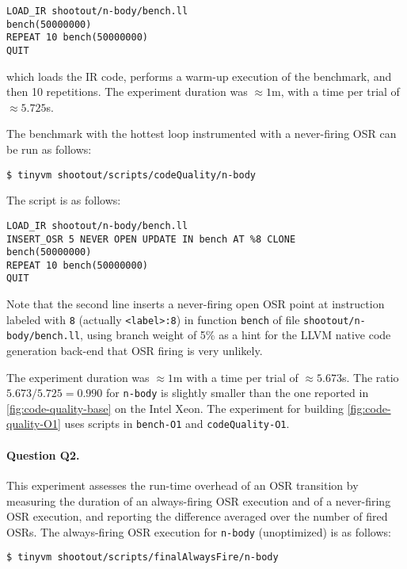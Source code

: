 \begin{small}
\begin{verbatim}
LOAD_IR shootout/n-body/bench.ll
bench(50000000)
REPEAT 10 bench(50000000)
QUIT
\end{verbatim}
\end{small}

\noindent which loads the IR code, performs a warm-up execution of the benchmark, and then 10 repetitions. The experiment duration was $\approx1$m, with a time per trial of $\approx5.725$s. 

The benchmark with the hottest loop instrumented with a never-firing OSR can be run as follows:

\begin{small}
\begin{verbatim}
$ tinyvm shootout/scripts/codeQuality/n-body
\end{verbatim}
\end{small}

\noindent The script is as follows:

\begin{small}
\begin{verbatim}
LOAD_IR shootout/n-body/bench.ll
INSERT_OSR 5 NEVER OPEN UPDATE IN bench AT %8 CLONE
bench(50000000)
REPEAT 10 bench(50000000)
QUIT
\end{verbatim}
\end{small}

\noindent Note that the second line inserts a never-firing open OSR point at instruction labeled with {\tt 8} (actually {\tt <label>:8}) in function {\tt bench} of file {\tt shootout/n-body/bench.ll}, using branch weight of 5\% as a hint for the LLVM native code generation back-end that OSR firing is very unlikely. 

The experiment duration was $\approx1$m with a time per trial of $\approx5.673$s. The ratio $5.673/5.725=0.990$ for {\tt n-body} is slightly smaller than the one reported in \ref{fig:code-quality-base} on the Intel Xeon. The experiment for building \ref{fig:code-quality-O1} uses scripts in {\tt bench-O1} and {\tt codeQuality-O1}.

\paragraph{Question Q2.} This experiment assesses the run-time overhead of an OSR transition by measuring the duration of an always-firing OSR execution and of a never-firing OSR execution, and reporting the difference averaged over the number of fired OSRs. The always-firing OSR execution for {\tt n-body} (unoptimized) is as follows:
\begin{small}
\begin{verbatim}
$ tinyvm shootout/scripts/finalAlwaysFire/n-body
\end{verbatim}
\end{small}

